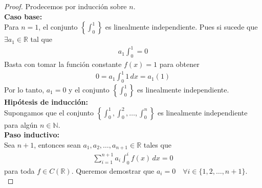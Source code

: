 \documentclass[11pt,letterpaper]{article}
\newcommand{\R}{\mathbb{R}}
\newcommand{\N}{\mathbb{N}}
\begin{document}
\begin{proof}
    Prodecemos por inducción sobre $n$.\\ [10pt]
    \textbf{Caso base:}\\ [10pt]
    Para $n = 1$, el conjunto $\left\{ \int_0^1 \right\}$ es linealmente independiente. Pues si sucede que
    $\exists a_1\in\R$ tal que \\ [10pt]
    \begin{align*}
        a_1\int_0^1 = 0
    \end{align*}
    Basta con tomar la función constante $f(x) = 1$ para obtener
    \begin{align*}
       0= a_1\int_0^1 1 \, dx = a_1(1)
    \end{align*}
    Por lo tanto, $a_1 = 0$ y el conjunto $\left\{ \int_0^1 \right\}$ es linealmente independiente.\\ [10pt]
    \textbf{Hipótesis de inducción:}\\ [10pt]
    Supongamos que el conjunto $\left\{ \int_0^1, \int_0^2, \dots, \int_0^n \right\}$ es linealmente independiente para algún $n \in \N$.\\ [10pt]
    \textbf{Paso inductivo:}\\ [10pt]
    Sea $n + 1$, entonces sean $a_1, a_2, \dots, a_{n+1} \in \R$ tales que
    \begin{align*}
        \sum_{i=1}^{n+1} a_i \int_0^i f(x) \, dx = 0
    \end{align*}
    para toda $f \in C(\R)$. Queremos demostrar que $a_i = 0 \quad \forall i \in \{1, 2, \dots, n+1\}$.\\ [10pt]

\end{proof}
\end{document}
